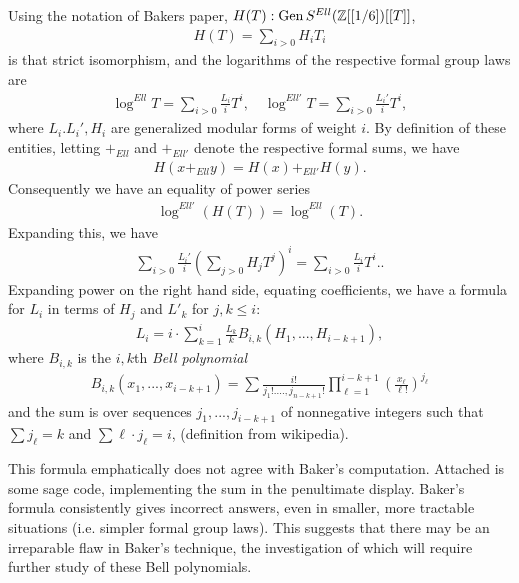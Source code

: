 \documentclass[11pt]{amsart}
\newcommand{\gen}{\operatorname{Gen}}
\begin{document}
Using the notation of Bakers paper, $H(T):\gen S^{Ell}(\Z[[1/6])[[T]]$,
	\begin{align*}
		H(T)=\sum_{i>0}H_{i}T_{i}
	\end{align*}
is that strict isomorphism, and the logarithms of the respective formal group laws are
	\begin{align*}
		\log^{Ell}T=\sum_{i>0}\frac{L_{i}}{i}T^{i}, \quad \log^{Ell'}T=\sum_{i>0}\frac{L_{i}'}{i}T^{i},
	\end{align*}
where $L_{i}.L_{i}',H_{i}$ are generalized modular forms of weight $i$. By definition of these entities, letting $+_{Ell}$  and $+_{Ell'}$ denote the respective formal sums, we have
	\begin{align*}
		H(x+_{Ell}y)=H(x)+_{Ell'}H(y).
	\end{align*}
Consequently we have an equality of power series
	\begin{align*}
		\log^{Ell'}(H(T))=\log^{Ell}(T). 
	\end{align*}
Expanding this, we have 
	\begin{align*}
		\sum_{i>0}\frac{L_{i}'}{i}(\sum_{j>0}H_{j}T^{j})^{i}=\sum_{i>0}\frac{L_{i}}{i}T^{i}..
	\end{align*}
Expanding power on the right hand side, equating coefficients, we have a formula for $L_{i}$ in terms of $H_{j}$ and $L'_{k}$ for $j,k\leq i$:
	\begin{align*}
		L_{i}=i\cdot \sum_{k=1}^{i} \frac{L_{k}}{k}B_{i,k}(H_{1},...,H_{i-k+1}),
	\end{align*}
where $B_{i,k}$ is the $i,k$th \emph{Bell polynomial}
	\begin{align*}
		B_{i,k}(x_{1},...,x_{i-k+1})=\sum\frac{i!}{j_{1}!....,j_{n-k+1}!}\prod_{\ell=1}^{i-k+1}\left(\frac{x_{\ell}}{\ell!}\right)^{j_{\ell}}
	\end{align*}
and the sum is over sequences $j_{1},...,j_{i-k+1}$ of nonnegative integers such that $\sum j_{\ell}=k$ and $\sum \ell\cdot j_{\ell}=i$, (definition from wikipedia).

This formula emphatically does not agree with Baker's computation. Attached is some sage code, implementing the sum in the penultimate display. Baker's formula consistently gives incorrect answers, even in smaller, more tractable situations (i.e. simpler formal group laws). This suggests that there may be an irreparable flaw in Baker's technique, the investigation of which will require further study of these Bell polynomials.
\end{document}
